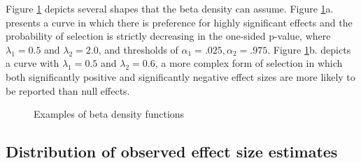 \documentclass[
  american,
  man, donotrepeattitle,floatsintext]{apa7}
\begin{document}
Figure \ref{fig:beta-functions} depicts several shapes that the beta density can assume. Figure \ref{fig:beta-functions}a. presents a curve in which there is preference for highly significant effects and the probability of selection is strictly decreasing in the one-sided p-value, where \(\lambda_1 = 0.5\) and \(\lambda_2 = 2.0\), and thresholds of \(\alpha_1 = .025, \alpha_2 = .975\). Figure \ref{fig:beta-functions}b. depicts a curve with \(\lambda_1 = 0.5\) and \(\lambda_2 = 0.6\), a more complex form of selection in which both significantly positive and significantly negative effect sizes are more likely to be reported than null effects.

\begin{figure}[tb]
\caption{Examples of beta density functions}\label{fig:beta-functions}
\end{figure}

\subsection{Distribution of observed effect size estimates}\label{distribution-of-observed-effect-size-estimates}
\end{document}
